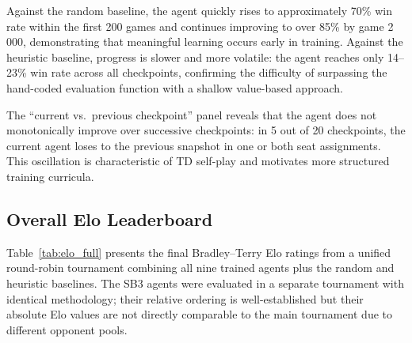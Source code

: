 \documentclass[conference]{IEEEtran}
\begin{document}
Against the random baseline, the agent quickly rises to approximately 70\% win
rate within the first 200 games and continues improving to over 85\% by game
2\,000, demonstrating that meaningful learning occurs early in training. Against
the heuristic baseline, progress is slower and more volatile: the agent reaches
only 14--23\% win rate across all checkpoints, confirming the difficulty of
surpassing the hand-coded evaluation function with a shallow value-based approach.

The ``current vs.\ previous checkpoint'' panel reveals that the agent does not
monotonically improve over successive checkpoints: in 5 out of 20 checkpoints,
the current agent loses to the previous snapshot in one or both seat assignments.
This oscillation is characteristic of TD self-play and motivates more structured
training curricula.

\subsection{Overall Elo Leaderboard}

Table~\ref{tab:elo_full} presents the final Bradley--Terry Elo ratings from a
unified round-robin tournament combining all nine trained agents plus the
random and heuristic baselines. The SB3 agents were evaluated in a separate
tournament with identical methodology; their relative ordering is well-established
but their absolute Elo values are not directly comparable to the main tournament
due to different opponent pools.
\end{document}
